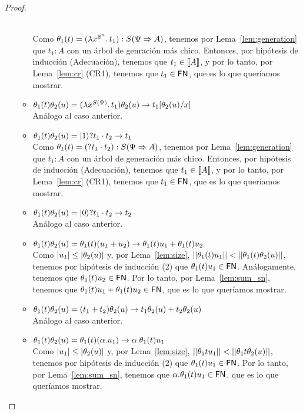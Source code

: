 \begin{proof}
\begin{itemize}
\begin{itemize}
      \\ Como \( \theta_1(t) = (\lambda x^{\mathbb{B}^n}\ldotp t_1) : S(\Psi \Rightarrow A) \), tenemos por Lema~\ref{lem:generation} que \( t_1 : A \) con un árbol de genración más chico. Entonces, por hipótesis de inducción (Adecuación), tenemos que \( t_1 \in \llbracket A\rrbracket \), y por lo tanto, por Lema~\ref{lem:cr} (CR1), tenemos que \( t_1 \in \mathsf{FN} \), que es lo que queríamos mostrar.
      \item \( \theta_1(t) \theta_2(u) = (\lambda x^{S(\Psi)}\ldotp t_1) \theta_2(u) \rightarrow t_1[\theta_2(u)/x] \)
      \\ Análogo al caso anterior.
      \item \( \theta_1(t) \theta_2(u) = \ket{1}? t_1 \cdot t_2 \rightarrow t_1 \)
      \\ Como \( \theta_1(t) = (? t_1 \cdot t_2) : S(\Psi \Rightarrow A) \), tenemos por Lema~\ref{lem:generation} que \( t_1 : A \) con un árbol de generación más chico. Entonces, por hipótesis de inducción (Adecuación), tenemos que \( t_1 \in \llbracket A\rrbracket \), y por lo tanto, por Lema~\ref{lem:cr} (CR1), tenemos que \( t_1 \in \mathsf{FN} \), que es lo que queríamos mostrar.
      \item \( \theta_1(t) \theta_2(u) = \ket{0}? t_1 \cdot t_2 \rightarrow t_2 \)
      \\ Análogo al caso anterior.
      \item \( \theta_1(t) \theta_2(u) = \theta_1(t) (u_1 + u_2) \rightarrow \theta_1(t) u_1 + \theta_1(t) u_2 \)
      \\ Como \( |u_1| \leq |\theta_2(u)| \) y, por Lema~\ref{lem:size}, \( ||\theta_1(t) u_1|| < ||\theta_1(t) \theta_2(u)|| \), tenemos por hipótesis de inducción (2) que \( \theta_1(t) u_1 \in \mathsf{FN} \). Análogamente, tenemos que \( \theta_1(t) u_2 \in \mathsf{FN} \). Por lo tanto, por Lema~\ref{lem:sum_sn}, tenemos que \( \theta_1(t) u_1 + \theta_1(t) u_2 \in \mathsf{FN} \), que es lo que queríamos mostrar.
      \item \( \theta_1(t) \theta_2(u) = (t_1 + t_2) \theta_2(u) \rightarrow t_1 \theta_2(u) + t_2 \theta_2(u) \)
      \\ Análogo al caso anterior.
      \item \( \theta_1(t) \theta_2(u) = \theta_1(t) (\alpha . u_1) \rightarrow \alpha . \theta_1(t) u_1 \)
      \\ Como \( |u_1| \leq |\theta_2(u)| \) y, por Lema~\ref{lem:size}, \( ||\theta_1{t} u_1|| < ||\theta_1{t} \theta_2(u)|| \), tenemos por hipótesis de inducción (2) que \( \theta_1(t) u_1 \in \mathsf{FN} \). Por lo tanto, por Lema~\ref{lem:sum_sn}, tenemos que \( \alpha . \theta_1(t) u_1 \in \mathsf{FN} \), que es lo que queríamos mostrar.

\end{itemize}
\end{itemize}
\end{proof}
